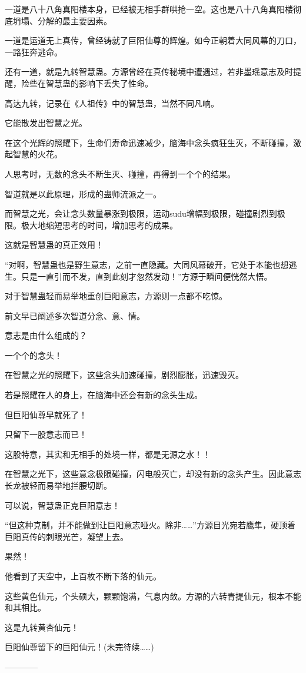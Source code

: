 \begin{this_body}
一道是八十八角真阳楼本身，已经被无相手群哄抢一空。这也是八十八角真阳楼彻底坍塌、分解的最主要因素。

一道是运道无上真传，曾经铸就了巨阳仙尊的辉煌。如今正朝着大同风幕的刀口，一路狂奔逃命。

还有一道，就是九转智慧蛊。方源曾经在真传秘境中遭遇过，若非墨瑶意志及时提醒，险些在智慧蛊的影响下丢失了性命。

高达九转，记录在《人祖传》中的智慧蛊，当然不同凡响。

它能散发出智慧之光。

在这个光辉的照耀下，生命们寿命迅速减少，脑海中念头疯狂生灭，不断碰撞，激起智慧的火花。

人思考时，无数的念头不断生灭、碰撞，再得到一个个的结果。

智道就是以此原理，形成的蛊师流派之一。

而智慧之光，会让念头数量暴涨到极限，运动sudu增幅到极限，碰撞剧烈到极限。极大地缩短思考的时间，增加思考的成果。

这就是智慧蛊的真正效用！

“对啊，智慧蛊也是野生意志，之前一直隐藏。大同风幕破开，它处于本能也想逃生。只是一直引而不发，直到此刻才忽然发动！”方源于瞬间便恍然大悟。

对于智慧蛊轻而易举地重创巨阳意志，方源则一点都不吃惊。

前文早已阐述多次智道分念、意、情。

意志是由什么组成的？

一个个的念头！

在智慧之光的照耀下，这些念头加速碰撞，剧烈膨胀，迅速毁灭。

若是照耀在人的身上，在脑海中还会有新的念头生成。

但巨阳仙尊早就死了！

只留下一股意志而已！

这股特意，其实和无相手的处境一样，都是无源之水！！

在智慧之光下，这些意念极限碰撞，闪电般灭亡，却没有新的念头产生。因此意志长龙被轻而易举地拦腰切断。

可以说，智慧蛊正克巨阳意志！

“但这种克制，并不能做到让巨阳意志哑火。除非……”方源目光宛若鹰隼，硬顶着巨阳真传的刺眼光芒，凝望上去。

果然！

他看到了天空中，上百枚不断下落的仙元。

这些黄色仙元，个头硕大，颗颗饱满，气息内敛。方源的六转青提仙元，根本不能和其相比。

这是九转黄杏仙元！

巨阳仙尊留下的巨阳仙元！(未完待续……)

------------

\end{this_body}


